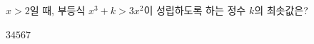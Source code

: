 $x>2$일 때, 부등식 $x^3+k>3x^2$이 성립하도록 하는 정수 $k$의 최솟값은?
\begin{choices32}{$3$}{$4$}{$5$}{$6$}{$7$}\end{choices32}
